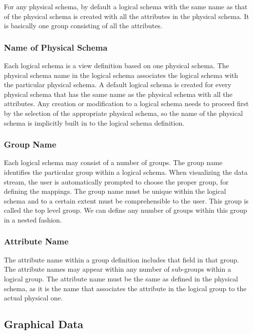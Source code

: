 For any physical schema, by default a logical schema with the same
name as that of the physical schema is created with all the attributes
in the physical schema. It is basically one group consisting of all
the attributes.

\subsubsection{Name of Physical Schema}

Each logical schema is a view definition based on one physical
schema. The physical schema name in the logical schema associates the
logical schema with the particular physical schema. A default logical
schema is created for every physical schema that has the same name as
the physical schema with all the attributes. Any creation or
modification to a logical schema needs to proceed first by the
selection of the appropriate physical schema, so the name of the
physical schema is implicitly built in to the logical schema
definition.

\subsubsection{Group Name}

Each logical schema may consist of a number of groups. The group name
identifies the particular group within a logical schema. When
visualizing the data stream, the user is automatically prompted to
choose the proper group, for defining the mappings. The group name
must be unique within the logical schema and to a certain extent must
be comprehensible to the user. This group is called the top level
group. We can define any number of groups within this group in a
nested fashion.

\subsubsection{Attribute Name}

The attribute name within a group definition includes that field in
that group. The attribute names may appear within any number of
sub-groups within a logical group. The attribute name must be the same
as defined in the physical schema, as it is the name that associates
the attribute in the logical group to the actual physical one.

\subsection{Graphical Data}

